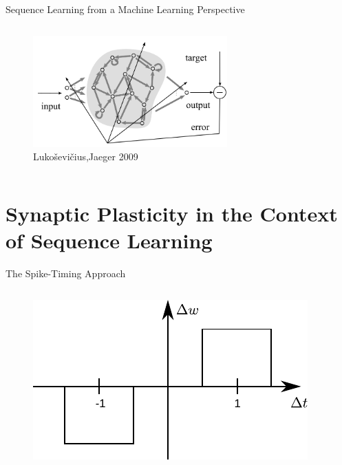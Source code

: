 \documentclass[8pt,aspectratio=169]{beamer}
\begin{document}
\begin{frame}{Sequence Learning from a Machine Learning Perspective}

\begin{columns}
\begin{column}{0.5\textwidth}
\begin{figure}
\includegraphics[width=0.7\textwidth]{./figures/rnn_mach_learn_illustration.png}
\caption*{\footnotesize Lukoševičius,Jaeger 2009}
\end{figure}
\end{column}
\begin{column}{0.5\textwidth}
\end{column}
\end{columns}
\end{frame}

\section{Synaptic Plasticity in the Context of Sequence Learning}

\begin{frame}{The Spike-Timing Approach}
\begin{columns}[T]
\begin{column}{0.5\textwidth}
\begin{figure}
\includegraphics{./figures/stdp_illustration.pdf}
\end{figure}
\end{column}
\begin{column}{0.5\textwidth}

\end{column}
\end{columns}
\end{frame}
\end{document}
